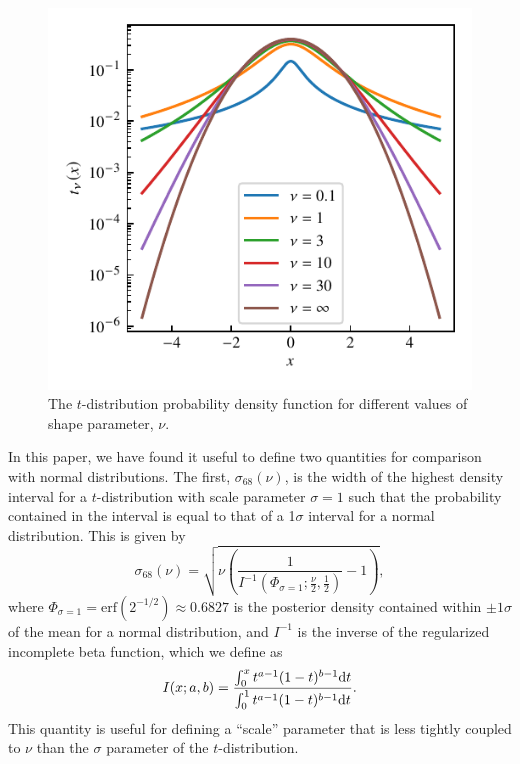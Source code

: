 \documentclass[fleqn,usenatbib]{rasti}
\begin{document}
\begin{figure}
	\includegraphics{graphics/t-dist-log.pdf}
    \caption{The $t$-distribution probability density function for different
    values of shape parameter, $\nu$.}
    \label{fig:model.t}
\end{figure}

In this paper, we have found it useful to define two quantities for comparison
with normal distributions. The first, $\sigma_{68}(\nu)$, is the width of the
highest density interval for a $t$-distribution with scale parameter $\sigma =
1$ such that the probability contained in the interval is equal to that of a
1$\sigma$ interval for a normal distribution. This is given by
\begin{equation}
    \sigma_{68}(\nu) =
        \sqrt{
            \nu \left(
                \frac{1}{I^{-1}(\Phi_{\sigma=1};\frac\nu2, \frac12)} - 1
            \right)
        },
    \label{eqn:model.sigma_68}
\end{equation}
where $\Phi_{\sigma=1} = \text{erf}(2^{-1/2}) \approx 0.6827$
is the posterior density contained within $\pm1\sigma$ of the mean for a normal
distribution, and $I^{-1}$ is the inverse of the regularized incomplete beta function, which we define as
\begin{equation}
    I(x; a, b) = \frac{
        \int_0^x t^{a-1} (1 - t)^{b-1} {\rm d}t
    }{
        \int_0^1 t^{a-1} (1 - t)^{b-1} {\rm d}t
    }.
\end{equation}
This quantity is useful for defining a ``scale'' parameter that is less tightly
coupled to $\nu$ than the $\sigma$ parameter of the $t$-distribution.
\end{document}
